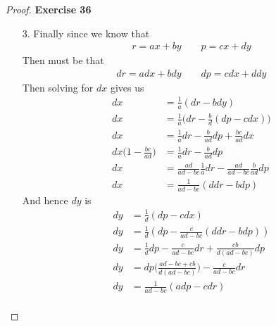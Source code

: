 \documentclass[11pt]{article}
\theoremstyle{definition}
\begin{document}
\begin{proof}{\textbf{Exercise 36}}
\begin{itemize}
\cleardoublepage
\item [3.] Finally since we know that
\begin{align*}
    r = ax + by \qquad p = cx + dy
\end{align*}
Then must be that
\begin{align*}
    dr = adx + bdy \qquad dp = cdx + ddy
\end{align*}
Then solving for $dx$ gives us
\begin{align*}
    dx &= \frac{1}{a}(dr - bdy)\\
    dx &= \frac{1}{a}\bigg(dr - \frac{b}{d}(dp - cdx)\bigg)\\
    dx &= \frac{1}{a}dr - \frac{b}{ad}dp + \frac{bc}{ad}dx\\
    dx\bigg(1 - \frac{bc}{ad}\bigg) &= \frac{1}{a}dr - \frac{b}{ad}dp\\
    dx &= \frac{ad}{ad - bc}\frac{1}{a}dr - \frac{ad}{ad - bc}\frac{b}{ad}dp\\
    dx &= \frac{1}{ad - bc}(ddr - bdp)
\end{align*}
And hence $dy$ is
\begin{align*}
    dy &= \frac{1}{d}(dp - cdx)\\
    dy &= \frac{1}{d}(dp - \frac{c}{ad - bc}(ddr - bdp))\\
    dy &= \frac{1}{d}dp - \frac{c}{ad - bc}dr + \frac{cb}{d(ad - bc)}dp\\
    dy &= dp\bigg(\frac{ad - bc + cb}{d(ad - bc)}\bigg) - \frac{c}{ad - bc}dr\\
    dy &= \frac{1}{ad - bc}(adp - cdr)\\
\end{align*}


\end{itemize}
\end{proof}
\end{document}
